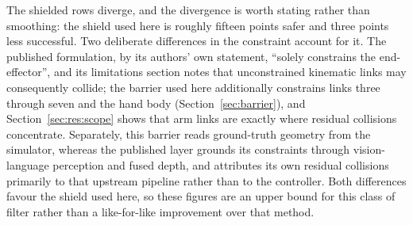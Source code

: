 The shielded rows diverge, and the divergence is worth stating rather than smoothing: the shield
used here is roughly fifteen points safer and three points less successful. Two deliberate
differences in the constraint account for it. The published formulation, by its authors' own
statement, ``solely constrains the end-effector'', and its limitations section notes that
unconstrained kinematic links may consequently collide; the barrier used here additionally
constrains links three through seven and the hand body (Section~\ref{sec:barrier}), and
Section~\ref{sec:res:scope} shows that arm links are exactly where residual collisions concentrate.
Separately, this barrier reads ground-truth geometry from the simulator, whereas the published
layer grounds its constraints through vision-language perception and fused depth, and attributes
its own residual collisions primarily to that upstream pipeline rather than to the controller.
Both differences favour the shield used here, so these figures are an upper bound for this class of
filter rather than a like-for-like improvement over that method.

